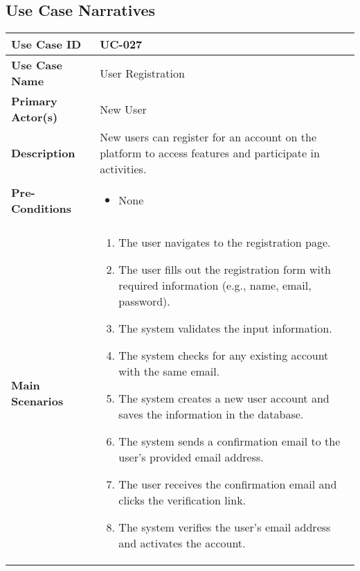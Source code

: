 \subsection{Use Case Narratives}


\begin{table}[!ht]
    \centering
    \renewcommand{\arraystretch}{1.3} %
    \begin{tabularx}{\textwidth}{|l|X|}
        \hline
        \textbf{Use Case ID} & UC-027 \\
        \hline
        \textbf{Use Case Name} & User Registration \\
        \hline
        \textbf{Primary Actor(s)} & New User \\
        \hline
        \textbf{Description} & New users can register for an account on the platform to access features and participate in activities. \\
        \hline
        \textbf{Pre-Conditions} & 
        \begin{itemize}[label=--,itemsep=0pt]
            \item None
        \end{itemize} \\
        \hline
        \textbf{Main Scenarios} & 
        \begin{enumerate}[label=\arabic*.,itemsep=0pt]
            \item The user navigates to the registration page.
            \item The user fills out the registration form with required information (e.g., name, email, password).
            \item The system validates the input information.
            \item The system checks for any existing account with the same email.
            \item The system creates a new user account and saves the information in the database.
            \item The system sends a confirmation email to the user's provided email address.
            \item The user receives the confirmation email and clicks the verification link.
            \item The system verifies the user's email address and activates the account.
        \end{enumerate} \\

\end{tabularx}
\end{table}
